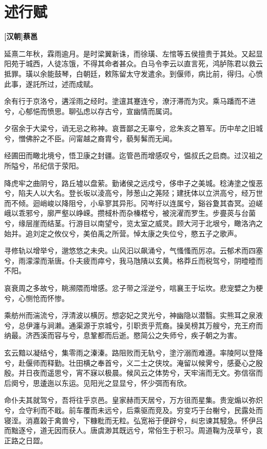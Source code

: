 \documentclass[UTF8,titlepage,oneside]{ctexbook}
\begin{document}
\chapter*{述行赋}
\begin{center}
	\textbf{[汉朝]蔡邕}
\end{center}

延熹二年秋，霖雨逾月。是时梁翼新诛，而徐璜、左悺等五侯擅贵于其处。又起显阳苑于城西，人徒冻饿，不得其命者甚众。白马令李云以直言死，鸿胪陈君以救云抵罪。璜以余能鼓琴，白朝廷，敕陈留太守发遣余。到偃师，病比前，得归。心愤此事，遂託所过，述而成赋。

余有行于京洛兮，遘淫雨之经时。塗邅其蹇连兮，潦汙滞而为灾。乘马蹯而不进兮，心郁悒而愤思。聊弘虑以存古兮，宣幽情而属词。

夕宿余于大梁兮，诮无忌之称神。哀晋鄙之无辜兮，忿朱亥之篡军。历中牟之旧城兮，憎佛肸之不臣。问甯越之裔胄兮，藐髣髴而无闻。

经圃田而瞰北境兮，悟卫康之封疆。迄管邑而增感叹兮，愠叔氏之启商。过汉祖之所隘兮，吊纪信于荥阳。

降虎牢之曲阴兮，路丘墟以盘萦。勤诸侯之远戍兮，侈申子之美城。稔涛塗之愎恶兮，陷夫人以大名。登长坂以淩高兮，陟葱山之荛陉；建抚体以立洪高兮，经万世而不倾。迴峭峻以降阻兮，小阜寥其异形。冈岑纡以连属兮，谿谷夐其杳冥。迫嵯峨以乖邪兮，廓严壑以峥嵘。攒棫朴而杂榛楛兮，被浣濯而罗生。步亹菼与台菌兮，缘层崖而结茎。行游目以南望兮，览太室之威灵。顾大河于北垠兮，瞰洛汭之始并。追刘定之攸仪兮，美伯禹之所营。悼太康之失位兮，愍五子之歌声。

寻修轨以增举兮，邈悠悠之未央。山风汩以飙涌兮，气慅慅而厉凉。云郁术而四塞兮，雨濛濛而渐唐。仆夫疲而瘁兮，我马虺隤以玄黄。格莽丘而税驾兮，阴曀曀而不阳。

哀衰周之多故兮，眺濒隈而增感。忿子带之淫逆兮，唁襄王于坛坎。悲宠嬖之为梗兮，心恻怆而怀惨。

乘舫州而湍流兮，浮清波以横厉。想宓妃之灵光兮，神幽隐以潜翳。实熊耳之泉液兮，总伊瀍与涧濑。通渠源于京城兮，引职贡乎荒裔。操吴榜其万艘兮，充王府而纳最。济西溪而容与兮，息鞏都而后逝。愍简公之失师兮，疾子朝之为害。

玄云黯以凝结兮，集零雨之溱溱。路阻败而无轨兮，塗泞溺而难遵。率陵阿以登降兮，赴偃师而释勤。壮田横之奉首兮，义二士之侠坟。淹留以候霁兮，感憂心之殷殷。并日夜而遥思兮，宵不寐以极晨。候风云之体势兮，天牢湍而无文。弥信宿而后阕兮，思逶迤以东运。见阳光之显显兮，怀少弭而有欣。

命仆夫其就驾兮，吾将往乎京邑。皇家赫而天居兮，万方徂而星集。贵宠煽以弥炽兮，佥守利而不戢。前车覆而未远兮，后乘驱而竞及。穷变巧于台榭兮，民露处而寝洷。消嘉榖于禽兽兮，下糠粃而无粒。弘宽裕于便辟兮，纠忠谏其駸急。怀伊吕而黜逐兮，道无因而获人。唐虞渺其既远兮，常俗生于积习。周道鞠为茂草兮，哀正路之日歰。
\end{document}
